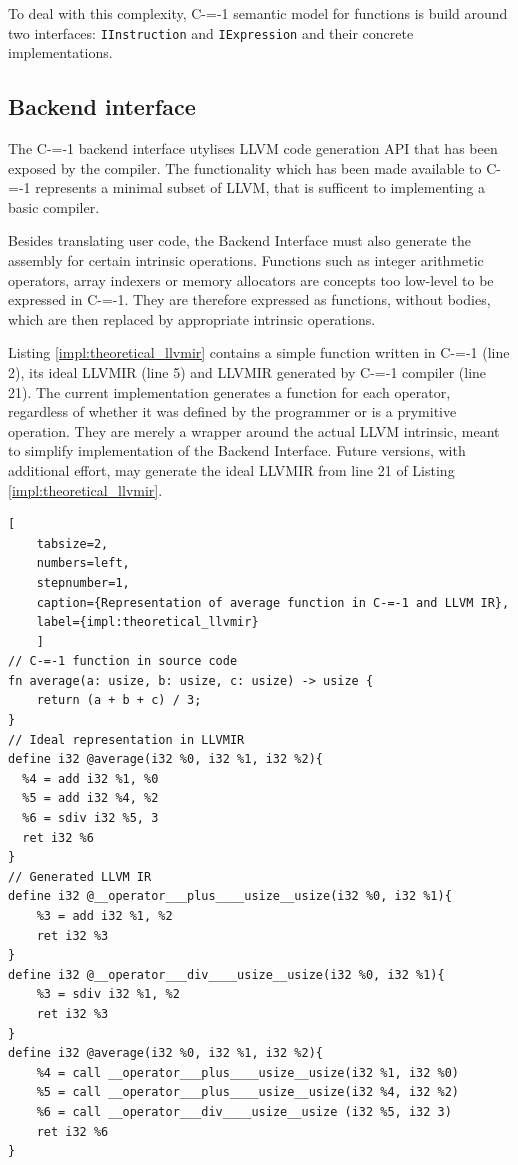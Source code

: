 To deal with this complexity, C-=-1 semantic model for functions is build around two interfaces: \lstinline{IInstruction} and \lstinline{IExpression} and their concrete implementations.

\subsection{Backend interface}
\label{implementation/backend-interface}

The C-=-1 backend interface utylises LLVM \cite{llvmir} code generation API that has been exposed by the compiler.
The functionality which has been made available to C-=-1 represents a minimal subset of LLVM, that is sufficent to implementing a basic compiler.

Besides translating user code, the Backend Interface must also generate the assembly for certain intrinsic operations.
Functions such as integer arithmetic operators, array indexers or memory allocators are concepts too low-level to be expressed in C-=-1.
They are therefore expressed as functions, without bodies, which are then replaced by appropriate intrinsic operations.

Listing \ref{impl:theoretical_llvmir} contains a simple function written in C-=-1 (line 2), its ideal LLVMIR (line 5) and LLVMIR generated by C-=-1 compiler (line 21).
The current implementation generates a function for each operator, regardless of whether it was defined by the programmer or is a prymitive operation.
They are merely a wrapper around the actual LLVM intrinsic, meant to simplify implementation of the Backend Interface.
Future versions, with additional effort, may generate the ideal LLVMIR from line 21 of Listing \ref{impl:theoretical_llvmir}.

\begin{minipage}{\linewidth}
	\begin{lstlisting}[
	tabsize=2,
	numbers=left,
	stepnumber=1,
	caption={Representation of average function in C-=-1 and LLVM IR},
	label={impl:theoretical_llvmir}
	]
// C-=-1 function in source code
fn average(a: usize, b: usize, c: usize) -> usize {
	return (a + b + c) / 3;
}
// Ideal representation in LLVMIR
define i32 @average(i32 %0, i32 %1, i32 %2){
  %4 = add i32 %1, %0
  %5 = add i32 %4, %2
  %6 = sdiv i32 %5, 3
  ret i32 %6
}
// Generated LLVM IR
define i32 @__operator___plus____usize__usize(i32 %0, i32 %1){
	%3 = add i32 %1, %2
	ret i32 %3
}
define i32 @__operator___div____usize__usize(i32 %0, i32 %1){
	%3 = sdiv i32 %1, %2
	ret i32 %3
}
define i32 @average(i32 %0, i32 %1, i32 %2){
	%4 = call __operator___plus____usize__usize(i32 %1, i32 %0)
	%5 = call __operator___plus____usize__usize(i32 %4, i32 %2)
	%6 = call __operator___div____usize__usize (i32 %5, i32 3)
	ret i32 %6
}
\end{lstlisting}
\end{minipage}

